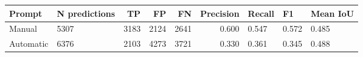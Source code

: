 \begin{table}[htbp]
\centering
\begin{tabular}{llrrrrlll}
\hline
Prompt & N predictions & TP & FP & FN & Precision & Recall & F1 & Mean IoU \\
\hline
Manual & 5307 & 3183 & 2124 & 2641 & 0.600 & 0.547 & 0.572 & 0.485 \\
Automatic & 6376 & 2103 & 4273 & 3721 & 0.330 & 0.361 & 0.345 & 0.488 \\
\hline
\end{tabular}
\end{table}
